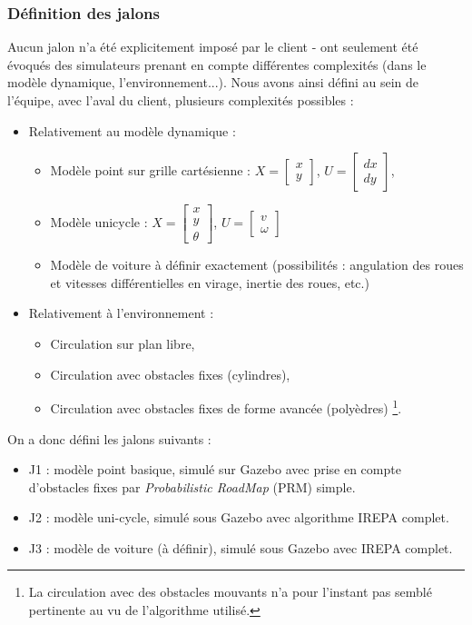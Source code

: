 \documentclass[a4paper,12pt]{report}
\newcommand{\bi}{\begin{itemize}}
\newcommand{\ei}{\end{itemize}}
\newcommand{\itemo}{\item[\textsf{o}]}
\begin{document}
\subsubsection{Définition des jalons}
Aucun jalon n'a été explicitement imposé par le client - ont seulement été évoqués des simulateurs prenant en compte différentes complexités (dans le modèle dynamique, l'environnement...). Nous avons ainsi défini au sein de l'équipe, avec l'aval du client, plusieurs complexités possibles :
\bi
\itemo Relativement au modèle dynamique :
	\bi
	\item Modèle point sur grille cartésienne : 
	$X = \begin{bmatrix} x \\ y \end{bmatrix}$, 
	$U = \begin{bmatrix} dx \\ dy \end{bmatrix}$,
	
	\item Modèle unicycle : 
	$X = \begin{bmatrix} x \\ y \\ \theta \end{bmatrix}$, 
	$U = \begin{bmatrix} v \\ \omega \end{bmatrix}$
	
	\item Modèle de voiture à définir exactement (possibilités : angulation des roues et vitesses différentielles en virage, inertie des roues, etc.)
	\ei
	
\itemo Relativement à l'environnement :
	\bi
	\item Circulation sur plan libre,
	\item Circulation avec obstacles fixes (cylindres),
	\item Circulation avec obstacles fixes de forme avancée (polyèdres) \footnote{La circulation avec des obstacles mouvants n'a pour l'instant pas semblé pertinente au vu de l'algorithme utilisé.}.
	\ei

\ei

\bigskip

	On a donc défini les jalons suivants :
	\bi
	\itemo \textsf{J1} : modèle point basique, simulé sur Gazebo avec prise en compte d'obstacles fixes par \textit{Probabilistic RoadMap} (PRM) simple.
	\itemo \textsf{J2} : modèle uni-cycle, simulé sous Gazebo avec algorithme IREPA complet.
	\itemo \textsf{J3} : modèle de voiture (à définir), simulé sous Gazebo avec IREPA complet.
	\ei
	
\end{document}
